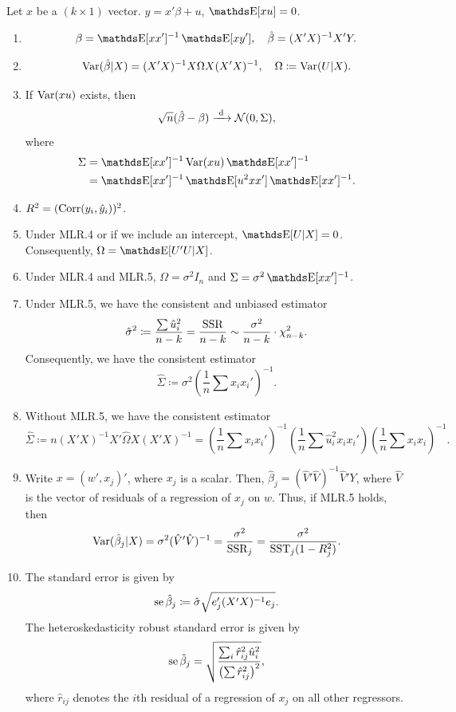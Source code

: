 \documentclass[letterpaper, 10pt]{article}
\begin{document}
\begin{tcolorbox}
Let \(x\) be a \((k \times 1)\) vector.
\(y = x' \beta + u\), \(\E[xu] = 0\).
\end{tcolorbox}
\begin{enumerate}[label=(\roman*)]
  \item
    \[
      \beta = \E[x x']^{-1} \E[x y'], \quad
      \hat{\beta} = (X' X)^{-1} X' Y.
    \]
  \item
    \[
      \operatorname{Var}(\hat{\beta}|X)
      = (X'X)^{-1} X \Omega X (X'X)^{-1}, \quad
      \Omega \coloneqq \operatorname{Var}(U|X).
    \]
  \item If \(\operatorname{Var}(xu)\) exists, then
    \[
      \sqrt{n} (\hat{\beta} - \beta)
      \xrightarrow{\ \mathrm{d}\ } \mathcal{N}(0, \Sigma),
    \]
    where
    \begin{align*}
      \Sigma
      &= \E[xx']^{-1} \Var(xu) \E[xx']^{-1} \\
      &= \E[xx']^{-1} \E[u^2 xx'] \E[xx']^{-1}.
    \end{align*}
  \item \(R^2 = (\operatorname{Corr}(y_i, \hat{y}_i))^2\).
  \item Under MLR.4 or if we include an intercept, \(\E[U|X] = 0\).
    Consequently, \(\Omega = \E[U'U|X]\).
  \item Under MLR.4 and MLR.5, \(\Omega = \sigma^2 I_n\) and \(\Sigma = \sigma^2 \E[x x']^{-1}\).
  \item Under MLR.5, we have the consistent and unbiased estimator
    \[
      \hat{\sigma}^2
      \coloneqq \frac{\sum \hat{u}_i^2}{n - k} = \frac{\operatorname{SSR}}{n - k}
      \sim \frac{\sigma^2}{n - k} \cdot \chi_{n - k}^2.
    \]
    Consequently, we have the consistent estimator
    \[
      \hat{\Sigma} \coloneqq \sigma^2 \left( \frac{1}{n} \sum x_i x_i' \right)^{-1}.
    \]
  \item Without MLR.5, we have the consistent estimator
    \[
      \hat{\Sigma}
      \coloneqq n (X' X)^{-1} X' \hat{\Omega} X (X' X)^{-1}
      = \left( \frac{1}{n} \sum x_i x_i' \right)^{-1} \left( \frac{1}{n} \sum \hat{u}_i^2 x_i x_i' \right) \left( \frac{1}{n} \sum x_i x_i \right)^{-1}.
    \]
  \item Write \(x = (w', x_j)'\), where \(x_j\) is a scalar.
    Then, \(\hat{\beta}_j = (\hat{V}' \hat{V})^{-1} \hat{V}' Y\), where \(\hat{V}\) is the vector of residuals of a regression of \(x_j\) on \(w\).
    Thus, if MLR.5 holds, then
    \[
      \operatorname{Var}(\hat{\beta}_j|X)
      = \sigma^2 (\hat{V}' \hat{V})^{-1}
      = \frac{\sigma^2}{\operatorname{SSR}_j}
      = \frac{\sigma^2}{\operatorname{SST}_j (1 - R_j^2)}.
    \]
  \item The standard error is given by
    \[
      \operatorname{se} \hat{\beta}_j \coloneqq \hat{\sigma} \sqrt{e_j' (X'X)^{-1} e_j}.
    \]
    The heteroskedasticity robust standard error is given by
    \[
      \operatorname{se} \hat{\beta}_j
      = \sqrt{\frac{\sum_i \hat{r}_{ij}^2 \hat{u}_i^2}{\left( \sum \hat{r}_{ij}^2 \right)^2}},
    \]
    where \(\hat{r}_{ij}\) denotes the \(i\)th residual of a regression of \(x_j\) on all other regressors.
\end{enumerate}
\end{document}
